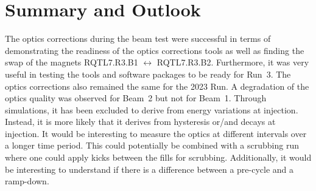 \documentclass[a4paper]{cernatsnote}
\begin{document}
\section{Summary and Outlook}
The optics corrections during the beam test were successful in terms of demonstrating the readiness of the optics corrections tools as well as finding the swap of the magnets RQTL7.R3.B1 $\leftrightarrow$ RQTL7.R3.B2. Furthermore, it was very useful in testing the tools and software packages to be ready for Run~3. The optics corrections also remained the same for the 2023 Run. A degradation of the optics quality was observed for Beam~2 but not for Beam~1. Through simulations, it has been excluded to derive from energy variations at injection. Instead, it is more likely that it derives from hysteresis or/and decays at injection. It would be interesting to measure the optics at different intervals over a longer time period. This could potentially be combined with a scrubbing run where one could apply kicks between the fills for scrubbing. Additionally, it would be interesting to understand if there is a difference between a pre-cycle and a ramp-down. 
\end{document}
